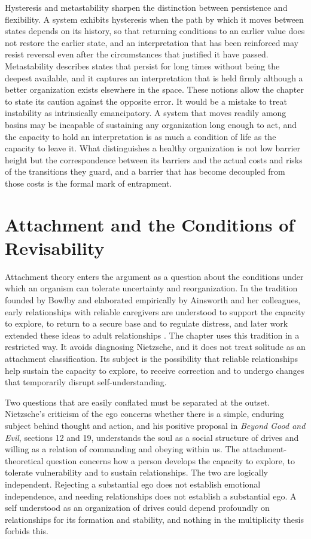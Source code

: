 Hysteresis and metastability sharpen the distinction between persistence and flexibility. A system exhibits hysteresis when the path by which it moves between states depends on its history, so that returning conditions to an earlier value does not restore the earlier state, and an interpretation that has been reinforced may resist reversal even after the circumstances that justified it have passed. Metastability describes states that persist for long times without being the deepest available, and it captures an interpretation that is held firmly although a better organization exists elsewhere in the space. These notions allow the chapter to state its caution against the opposite error. It would be a mistake to treat instability as intrinsically emancipatory. A system that moves readily among basins may be incapable of sustaining any organization long enough to act, and the capacity to hold an interpretation is as much a condition of life as the capacity to leave it. What distinguishes a healthy organization is not low barrier height but the correspondence between its barriers and the actual costs and risks of the transitions they guard, and a barrier that has become decoupled from those costs is the formal mark of entrapment.

\chapter{Attachment and the Conditions of Revisability}

Attachment theory enters the argument as a question about the conditions under which an organism can tolerate uncertainty and reorganization. In the tradition founded by Bowlby and elaborated empirically by Ainsworth and her colleagues, early relationships with reliable caregivers are understood to support the capacity to explore, to return to a secure base and to regulate distress, and later work extended these ideas to adult relationships \citep{bowlby1969,ainsworth1978}. The chapter uses this tradition in a restricted way. It avoids diagnosing Nietzsche, and it does not treat solitude as an attachment classification. Its subject is the possibility that reliable relationships help sustain the capacity to explore, to receive correction and to undergo changes that temporarily disrupt self-understanding.

Two questions that are easily conflated must be separated at the outset. Nietzsche's criticism of the ego concerns whether there is a simple, enduring subject behind thought and action, and his positive proposal in \emph{Beyond Good and Evil}, sections 12 and 19, understands the soul as a social structure of drives and willing as a relation of commanding and obeying within us. The attachment-theoretical question concerns how a person develops the capacity to explore, to tolerate vulnerability and to sustain relationships. The two are logically independent. Rejecting a substantial ego does not establish emotional independence, and needing relationships does not establish a substantial ego. A self understood as an organization of drives could depend profoundly on relationships for its formation and stability, and nothing in the multiplicity thesis forbids this.

